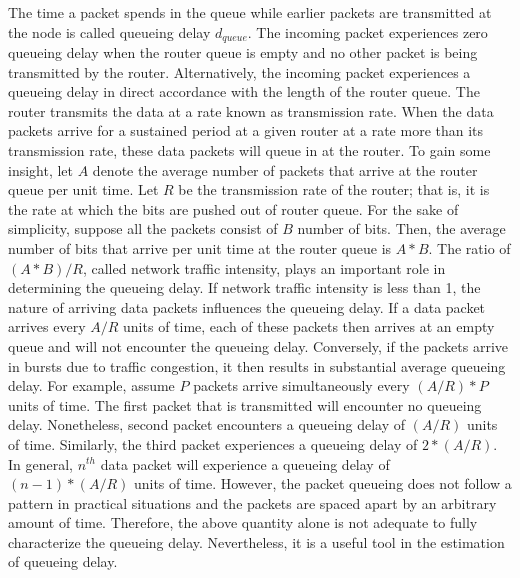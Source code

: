 \documentclass[10pt,conference,compsocconf]{IEEEtran}
\begin{document}
The time a packet spends in the queue while earlier packets are transmitted at the node is called queueing delay $d_{queue}$. The incoming packet experiences zero queueing delay when the router queue is empty and no other packet is being transmitted by the router. Alternatively, the incoming packet experiences a queueing delay in direct accordance with the length of the router queue. The router transmits the data at a rate known as transmission rate. When the data packets arrive for a sustained period at a given router at a rate more than its transmission rate, these data packets will queue in at the router.
To gain some insight, let ${A}$ denote the average number of packets that arrive at the router queue per unit time. Let $ {R}$ be the transmission rate of the router; that is, it is the rate at which the bits are pushed out of router queue. For the sake of simplicity, suppose all the packets consist of ${B}$ number of bits. Then, the average number of bits that arrive per unit time at the router queue is $A*B$. The ratio of $(A*B)/R$, called network traffic intensity, plays an important role in determining the queueing delay. If network traffic intensity is less than 1, the nature of arriving data packets influences the queueing delay. If a data packet arrives every $A/R$ units of time, each of these packets then arrives at an empty queue and will not encounter the queueing delay. Conversely, if the packets arrive in bursts due to traffic congestion, it then results in substantial average queueing delay. For example, assume ${P}$ packets arrive simultaneously every $(A/R)*P$ units of time. The first packet that is transmitted will encounter no queueing delay. Nonetheless, second packet encounters a queueing delay of $(A/R)$ units of time. Similarly, the third packet experiences a queueing delay of $2*(A/R)$. In general, $n^{th}$ data packet will experience a queueing delay of $(n-1)*(A/R)$ units of time. However, the packet queueing does not follow a pattern in practical situations and the packets are spaced apart by an arbitrary amount of time. Therefore, the above quantity alone is not adequate to fully characterize the queueing delay. Nevertheless, it is a useful tool in the estimation of queueing delay. 
\end{document}
